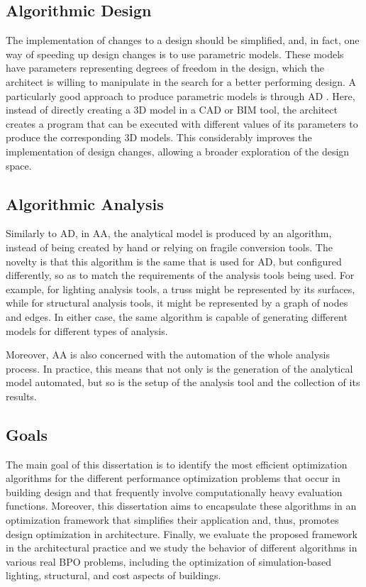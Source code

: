 \subsection{Algorithmic Design}
	The implementation of changes to a design should be simplified, and, in fact, one way of speeding up design changes is to use parametric models. These models have parameters representing degrees of freedom in the design, which the architect is willing to manipulate in the search for a better performing design. A particularly good approach to produce parametric models is through \ac{AD} \cite{Terzidis2006}. Here, instead of directly creating a 3D model in a \ac{CAD} or \ac{BIM} tool, the architect creates a program that can be executed with different values of its parameters to produce the corresponding 3D models. This considerably improves the implementation of design changes, allowing a broader exploration of the design space.

\subsection{Algorithmic Analysis}
	Similarly to \ac{AD}, in \ac{AA}, the analytical model is produced by an algorithm, instead of being created by hand or relying on fragile conversion tools. The novelty is that this algorithm is the same that is used for \ac{AD}, but configured differently, so as to match the requirements of the analysis tools being used. For example, for lighting analysis tools, a truss might be represented by its surfaces, while for structural analysis tools, it might be represented by a graph of nodes and edges. In either case, the same algorithm is capable of generating different models for different types of analysis.

	Moreover, \ac{AA} is also concerned with the automation of the whole analysis process. In practice, this means that not only is the generation of the analytical model automated, but so is the setup of the analysis tool and the collection of its results.

\subsection{Goals}

The main goal of this dissertation is to identify the most efficient optimization algorithms for the different performance optimization problems that occur in building design and that frequently involve computationally heavy evaluation functions. Moreover, this dissertation aims to encapsulate these algorithms in an optimization framework that simplifies their application and, thus, promotes design optimization in architecture. Finally, we evaluate the proposed framework in the architectural practice and we study the behavior of different algorithms in various real \ac{BPO} problems, including the optimization of simulation-based lighting, structural, and cost aspects of buildings. 